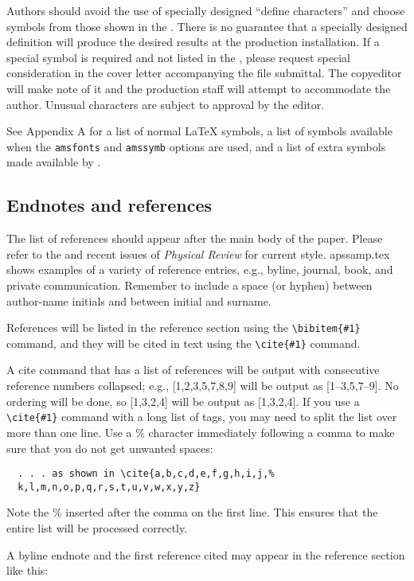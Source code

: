 Authors should avoid the use of specially designed ``define characters''
and choose symbols from those shown in the \LUG{}. There is no guarantee
that a specially designed definition will produce the desired results at
the production installation. If a special symbol is required and not listed
in the \LUG, please request special consideration in the cover letter
accompanying the file submittal.  The copyeditor will make note of it and
the production staff will attempt to accommodate the author.  Unusual
characters are subject to approval by the editor.

See Appendix A for a list of normal \LaTeX{} symbols, a list of symbols
available when the \verb+amsfonts+ and \verb+amssymb+ options are used, and
a list of extra symbols made available by \REVTeX.

\subsection{Endnotes and references}
\label{sec:endnotes}

The list of references should appear after the main body of the paper.
Please refer to the \SNG{} and recent issues of {\em Physical Review\/} for
current style. apssamp.tex shows examples of a variety of reference
entries, e.g., byline, journal, book, and private communication. Remember
to include a space (or hyphen) between author-name initials and between
initial and surname.

References will be listed in the reference section using the
\verb+\bibitem{#1}+ command, and they will be cited in text using the
\verb+\cite{#1}+ command.

A cite command that has a list of references will be output with
consecutive reference numbers collapsed; e.g., [1,2,3,5,7,8,9] will be
output as [1--3,5,7--9]. No ordering will be done, so [1,3,2,4] will be
output as [1,3,2,4]. If you use a \verb+\cite{#1}+ command with a long list
of tags, you may need to split the list over more than one line. Use a \%
character immediately following a comma to make sure that you do not get
unwanted spaces:
\begin{verbatim}
  . . . as shown in \cite{a,b,c,d,e,f,g,h,i,j,%
  k,l,m,n,o,p,q,r,s,t,u,v,w,x,y,z}
\end{verbatim}
Note the \% inserted after the comma on the first line. This ensures that
the entire list will be processed correctly.


A byline endnote and the first reference cited may  appear in the reference
section like this:

